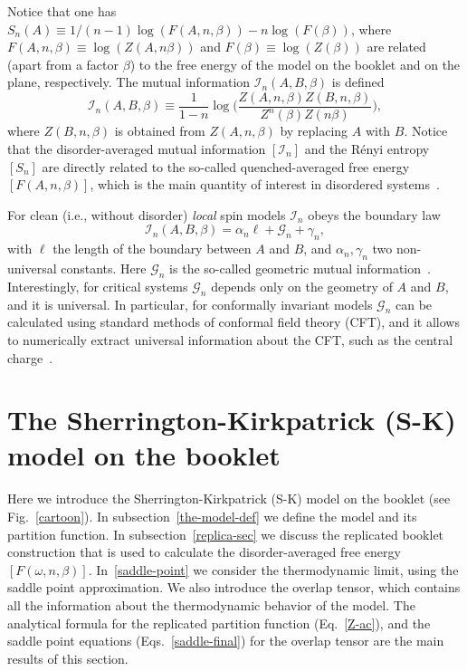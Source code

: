 \documentclass[twocolumn,superscriptaddress,prb,10pt]{revtex4-1}
\begin{document}
Notice that one has $S_n(A)\equiv1/(n-1)\log(F(A,n,\beta))-n\log(F(\beta))$, where $F(A,n,\beta)
\equiv\log(Z(A,n\beta))$ and $F(\beta)\equiv\log(Z(\beta))$ are related (apart from a factor 
$\beta$) to the free energy of the model on the booklet and on the plane, respectively.
The mutual information ${\mathcal I}_n(A,B,\beta)$ is defined~\cite{jaconis-2013,stephan-2014} 
%
\begin{equation}
\label{MI}
{\mathcal I}_n(A,B,\beta)\equiv\frac{1}{1-n}\log\Big(
\frac{Z(A,n,\beta)Z(B,n,\beta)}{Z^n(\beta)Z(n\beta)}
\Big),
\end{equation}
%
where $Z(B,n,\beta)$ is obtained from $Z(A,n,\beta)$ by replacing $A$ with $B$. 
Notice that the disorder-averaged mutual information $[{\mathcal I}_n]$ and the R\'enyi 
entropy $[S_n]$ are directly related to the so-called quenched-averaged free energy 
$[F(A,n,\beta)]$, which is the main quantity of interest in disordered systems~\cite{cardy-book}. 

For clean (i.e., without disorder) \emph{local} spin models ${\mathcal I}_n$ 
obeys the boundary law 
%
\begin{equation}
{\mathcal I}_n(A,B,\beta)=\alpha_n\ell+{\mathcal G}_n+\gamma_n,
\label{GMI}
\end{equation}
%
with $\ell$ the length of the boundary between $A$ and $B$, and 
$\alpha_n,\gamma_n$ two non-universal constants. Here ${\mathcal G}_n$ 
is the so-called geometric mutual information~\cite{stephan-2014}. 
Interestingly, for critical systems ${\mathcal G}_n$ depends only on the 
geometry of $A$ and $B$, and it is universal. In particular, for conformally 
invariant models ${\mathcal G}_n$ can be calculated using standard methods of 
conformal field theory (CFT), and it allows to numerically 
extract universal information about the CFT, such as the central 
charge~\cite{stephan-2014}.  


\section{The Sherrington-Kirkpatrick (S-K) model on the booklet}
\label{the-model}

Here we introduce the Sherrington-Kirkpatrick (S-K) model on the booklet 
(see Fig.~\ref{cartoon}). In subsection~\ref{the-model-def}  we define the 
model and its partition function. In subsection~\ref{replica-sec} 
we discuss the replicated booklet construction that is used to calculate the 
disorder-averaged free energy $[F(\omega,n,\beta)]$. 
In~\ref{saddle-point} we consider the thermodynamic limit, 
using the saddle point approximation. We also introduce the overlap tensor,  
which contains all the information about the thermodynamic behavior of the 
model. The analytical formula for the replicated partition function (Eq.~\eqref{Z-ac}), 
and the saddle point equations (Eqs.~\eqref{saddle-final}) for the overlap tensor 
are the main results of this section. 
\end{document}
